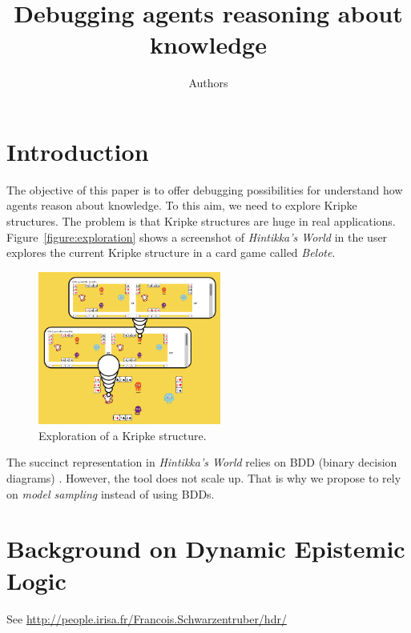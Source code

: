 \documentclass{article}
\begin{document}
\title{Debugging agents reasoning about knowledge}
\author{Authors}

\maketitle


\section{Introduction}

The objective of this paper is to offer debugging possibilities for understand how agents reason about knowledge. To this aim, we need to explore Kripke structures. The problem is that Kripke structures are huge in real applications. Figure~\ref{figure:exploration} shows a screenshot of \emph{Hintikka's World} in the user explores the current Kripke structure in a card game called \emph{Belote}.

\begin{figure}
	\begin{center}
		\includegraphics[width=6cm]{images/hintikkasworld_exploration.png}
	\end{center}
	\caption{Exploration of a Kripke structure.}
\end{figure}

The succinct representation in \emph{Hintikka's World} relies on BDD (binary decision diagrams) \cite{DBLP:conf/ijcai/CharrierGNS19}. However, the tool does not scale up. That is why we propose to rely on \emph{model sampling}  \cite{DBLP:conf/lpar/SharmaGRM18} instead of using BDDs.


\section{Background on Dynamic Epistemic Logic}

See \url{http://people.irisa.fr/Francois.Schwarzentruber/hdr/}
\end{document}
